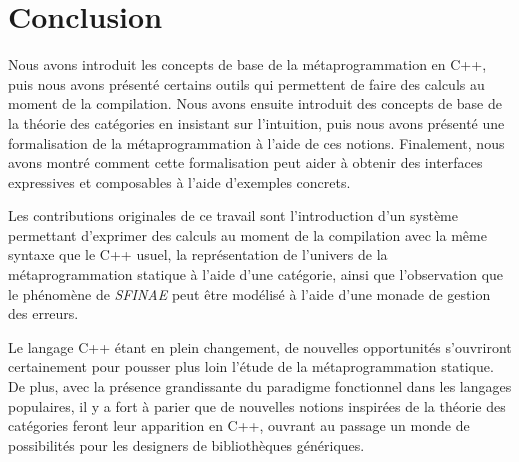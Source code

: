 \section{Conclusion}
Nous avons introduit les concepts de base de la métaprogrammation en C++, puis
nous avons présenté certains outils qui permettent de faire des calculs au
moment de la compilation. Nous avons ensuite introduit des concepts de base
de la théorie des catégories en insistant sur l'intuition, puis nous avons
présenté une formalisation de la métaprogrammation à l'aide de ces notions.
Finalement, nous avons montré comment cette formalisation peut aider à obtenir
des interfaces expressives et composables à l'aide d'exemples concrets.

Les contributions originales de ce travail sont l'introduction d'un système
permettant d'exprimer des calculs au moment de la compilation avec la
même syntaxe que le C++ usuel, la représentation de l'univers de la
métaprogrammation statique à l'aide d'une catégorie, ainsi que l'observation
que le phénomène de \textit{SFINAE} peut être modélisé à l'aide d'une monade
de gestion des erreurs.

Le langage C++ étant en plein changement, de nouvelles opportunités s'ouvriront
certainement pour pousser plus loin l'étude de la métaprogrammation statique.
De plus, avec la présence grandissante du paradigme fonctionnel dans les
langages populaires, il y a fort à parier que de nouvelles notions inspirées
de la théorie des catégories feront leur apparition en C++, ouvrant au passage
un monde de possibilités pour les designers de bibliothèques génériques.
